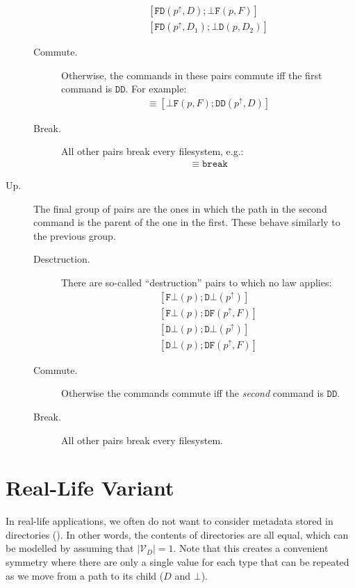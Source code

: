 \documentclass[12pt]{article}
\newcommand{\setvx}[1]{\mathcal{V}_{#1}}
\newcommand{\setd}{\setvx{D}}
\newcommand{\empt}{\bot}
\newcommand{\pp}{p^\uparrow} %
\newcommand{\cbrk}{\mathtt{break}}
\newcommand{\fscommand}[2]{{#1#2}}
\newcommand{\fsregcommandchar}[1]{\mathtt{#1}}
\newcommand{\fsregcommand}[2]{\fscommand{\fsregcommandchar{#1}}{\fsregcommandchar{#2}}}
\newcommand{\cbf}{\fsregcommand{\empt}{F}}
\newcommand{\cbd}{\fsregcommand{\empt}{D}}
\newcommand{\cfb}{\fsregcommand{F}{\empt}}
\newcommand{\cfd}{\fsregcommand{F}{D}}
\newcommand{\cdb}{\fsregcommand{D}{\empt}}
\newcommand{\cdf}{\fsregcommand{D}{F}}
\newcommand{\cdd}{\fsregcommand{D}{D}}
\theoremstyle{definition}
\begin{document}
\begin{description}
\begin{description}
\begin{gather*}
            [\cfd(\pp, D); \cbf(p, F)] \\
            [\cfd(\pp, D_1); \cbd(p, D_2)]
   \end{gather*}
   \item[Commute.] Otherwise, the commands in these pairs commute iff the first command is $\cdd$. For example:
   \begin{gather*}
   [\cdd(\pp, D); \cbf(p, F)] \equiv [\cbf(p, F); \cdd(\pp, D)]
   \end{gather*}
   \item[Break.] All other pairs break every filesystem, e.g.:
   \begin{gather*}
   [\cdf(\pp, F); \cbd(p, D)] \equiv \cbrk
   \end{gather*}
   \end{description}
%
\item[Up.]
The final group of pairs are the ones in which the path in the second
command is the parent of the one in the first.
These behave similarly to the previous group. 
   \begin{description}
   \item[Desctruction.] There are
   so-called ``destruction'' pairs to which no law applies:
   \begin{gather*}
            [\cfb(p); \cdb(\pp)] \\
            [\cfb(p); \cdf(\pp, F)] \\
            [\cdb(p); \cdb(\pp)] \\
            [\cdb(p); \cdf(\pp, F)]
   \end{gather*}
   \item[Commute.] Otherwise the commands commute iff the \emph{second} command is $\cdd$.
   \item[Break.] All other pairs break every filesystem.
   \end{description}
\end{description}

\section{Real-Life Variant}

In real-life applications, we often do not want to consider metadata stored in
directories (\cite{BZ}). In other words, the contents of directories are all equal,
which can be modelled by assuming that $|\setd|=1$.
Note that this creates a convenient symmetry where there are only a single value
for each type that can be repeated as we move from a path to its child ($D$ and $\empt$).
\end{document}
